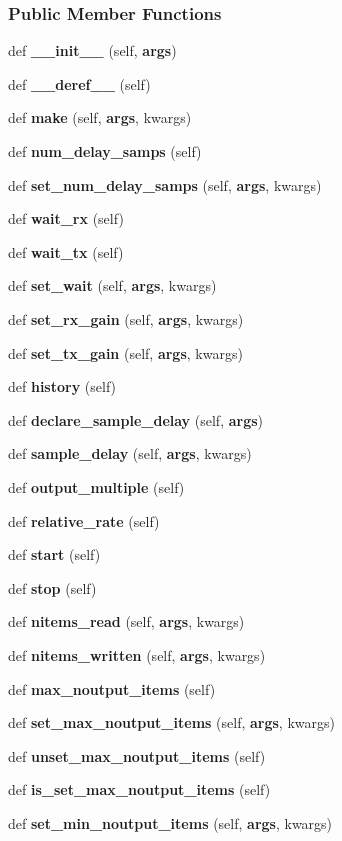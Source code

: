 \subsubsection*{Public Member Functions}
\begin{DoxyCompactItemize}
\item 
def {\bf \+\_\+\+\_\+init\+\_\+\+\_\+} (self, {\bf args})
\item 
def {\bf \+\_\+\+\_\+deref\+\_\+\+\_\+} (self)
\item 
def {\bf make} (self, {\bf args}, kwargs)
\item 
def {\bf num\+\_\+delay\+\_\+samps} (self)
\item 
def {\bf set\+\_\+num\+\_\+delay\+\_\+samps} (self, {\bf args}, kwargs)
\item 
def {\bf wait\+\_\+rx} (self)
\item 
def {\bf wait\+\_\+tx} (self)
\item 
def {\bf set\+\_\+wait} (self, {\bf args}, kwargs)
\item 
def {\bf set\+\_\+rx\+\_\+gain} (self, {\bf args}, kwargs)
\item 
def {\bf set\+\_\+tx\+\_\+gain} (self, {\bf args}, kwargs)
\item 
def {\bf history} (self)
\item 
def {\bf declare\+\_\+sample\+\_\+delay} (self, {\bf args})
\item 
def {\bf sample\+\_\+delay} (self, {\bf args}, kwargs)
\item 
def {\bf output\+\_\+multiple} (self)
\item 
def {\bf relative\+\_\+rate} (self)
\item 
def {\bf start} (self)
\item 
def {\bf stop} (self)
\item 
def {\bf nitems\+\_\+read} (self, {\bf args}, kwargs)
\item 
def {\bf nitems\+\_\+written} (self, {\bf args}, kwargs)
\item 
def {\bf max\+\_\+noutput\+\_\+items} (self)
\item 
def {\bf set\+\_\+max\+\_\+noutput\+\_\+items} (self, {\bf args}, kwargs)
\item 
def {\bf unset\+\_\+max\+\_\+noutput\+\_\+items} (self)
\item 
def {\bf is\+\_\+set\+\_\+max\+\_\+noutput\+\_\+items} (self)
\item 
def {\bf set\+\_\+min\+\_\+noutput\+\_\+items} (self, {\bf args}, kwargs)
\item 

\end{DoxyCompactItemize}
